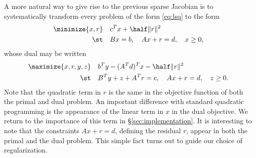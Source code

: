 \documentclass{amsart}
\begin{document}
A more natural way to give rise to the previous sparse Jacobian is to
systematically transform every problem of the form \eqref{eq:lsq} to the form
\begin{equation}
  \label{eq:lsq-r}
  \begin{aligned}
    \minimize{x, r} \quad & c^T x + \half \|r\|^2 \\
    \st \quad & Bx = b, \quad Ax + r = d, \quad x \geq 0,
  \end{aligned}
\end{equation}
whose dual may be written
\begin{equation}
  \label{eq:lsq-r-dual}
  \begin{aligned}
    \maximize{x, r, y, z} \quad & b^T y - (A^T d)^T x - \half \|r\|^2 \\
    \st \quad & B^T y + z + A^T r = c, \quad
                Ax + r = d, \quad z \geq 0.
  \end{aligned}
\end{equation}
Note that the quadratic term in $r$ is the same in the objective function of
both the primal and dual problem. An important difference with standard
quadratic programming is the appearance of the linear term in $x$ in the
dual objective. We return to the importance of this term in
\S\ref{sec:implementation}.
It is interesting to note that the constraints $Ax + r = d$, defining the
residual $r$, appear in both the primal and the dual problem. This simple fact
turns out to guide our choice of regularization.
\end{document}
